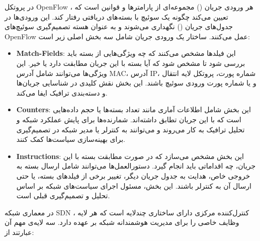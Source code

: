

در پروتکل OpenFlow ، هر {ورودی جریان ()} مجموعه‌ای از پارامترها و قوانین است که تعیین می‌کند چگونه یک سوئیچ با بسته‌های دریافتی رفتار کند. این ورودی‌ها در جدول‌های جریان () نگهداری می‌شوند و به عنوان هسته تصمیم‌گیری سوئیچ‌های OpenFlow عمل می‌کنند. ساختار یک ورودی جریان شامل سه بخش اصلی زیر است:

\begin{itemize}
	\item {\textbf{Match-Fields}}: این فیلدها مشخص می‌کنند که چه ویژگی‌هایی از بسته باید بررسی شود تا مشخص شود که آیا بسته با این جریان مطابقت دارد یا خیر. این ویژگی‌ها می‌توانند شامل آدرس MAC، آدرس IP، شماره پورت، پروتکل لایه انتقال و یا شماره پورت ورودی سوئیچ باشند. این بخش نقش کلیدی در شناسایی جریان‌ها و دسته‌بندی ترافیک ایفا می‌کند.
	
	\item \textbf{Counters}: این بخش شامل اطلاعات آماری مانند تعداد بسته‌ها یا حجم داده‌هایی است که با این جریان تطابق داشته‌اند. شمارنده‌ها برای پایش عملکرد شبکه و تحلیل ترافیک به کار می‌روند و می‌توانند به کنترلر یا مدیر شبکه در تصمیم‌گیری برای بهینه‌سازی سیاست‌ها کمک کنند.
	
	\item \textbf{Instructions}: این بخش مشخص می‌سازد که در صورت مطابقت بسته با این جریان، چه اقداماتی باید انجام گیرد. دستورالعمل‌ها می‌توانند شامل ارسال بسته به خروجی خاص، هدایت به جدول جریان دیگر، تغییر برخی از فیلدهای بسته، یا حتی ارسال آن به کنترلر باشند. این بخش، مسئول اجرای سیاست‌های شبکه بر اساس تحلیل و تصمیم‌گیری قبلی است.
\end{itemize}




در معماری شبکه SDN ، کنترل‌کننده مرکزی دارای ساختاری چندلایه است که هر لایه وظایف خاصی را برای مدیریت هوشمندانه شبکه بر عهده دارد. سه لایه‌ی مهم آن عبارتند از:

